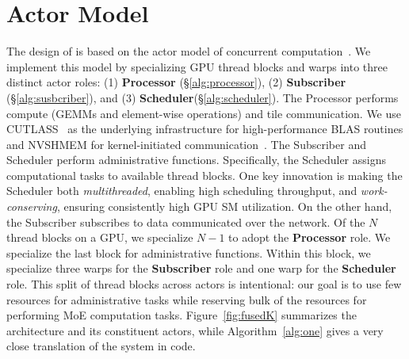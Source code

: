 \section{Actor Model}\label{sec:actor-model}
The design of \sysname is based on the actor model of concurrent
computation~\cite{agha:85, 10.5555/1624775.1624804, Greif:75}.
We implement this model by specializing GPU thread blocks and warps into three distinct actor roles:
(1) \textbf{Processor} (\S\ref{alg:processor}),
(2) \textbf{Subscriber} (\S\ref{alg:susbcriber}),
and (3) \textbf{Scheduler}(\S\ref{alg:scheduler}).
The Processor performs compute (GEMMs and element-wise operations)
and tile communication.
We use CUTLASS~\cite{Thakkar_CUTLASS_2023} as the underlying infrastructure for high-performance
BLAS routines and NVSHMEM for kernel-initiated communication~\cite{nvshm}.
The Subscriber and Scheduler perform administrative functions.
Specifically, the Scheduler assigns computational tasks to available thread blocks.
One key innovation is making the Scheduler both \emph{multithreaded},
enabling high scheduling throughput, and \emph{work-conserving},
ensuring consistently high GPU SM utilization.
On the other hand, the Subscriber subscribes to data communicated over the network.
Of the $N$ thread blocks on a GPU, we specialize $N-1$ to adopt the \textbf{Processor} role.
We specialize the last block for administrative functions.
Within this block, we specialize three warps for the \textbf{Subscriber} role and one warp
for the \textbf{Scheduler} role.
This split of thread blocks across actors is intentional:
our goal is to use few resources for administrative tasks while reserving
bulk of the resources for performing MoE computation tasks.
Figure~\ref{fig:fusedK} summarizes the \sysname architecture and its constituent actors,
while Algorithm~\ref{alg:one} gives a very close translation of the system in code.
